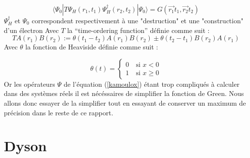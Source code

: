 \documentclass[12pt]{article}
\begin{document}
\begin{equation}
\label{kamoulox}
 \langle \Psi_0 | T \Psi_H (r_1, t_1) \Psi_H^\dagger (r_2, t_2) | \Psi_0 \rangle = G(\vec{r_1} t_1, \vec{r_2}  t_2)
\end{equation}
$\Psi_H^\dagger$ et $\Psi_0$ correspondent respectivement à une "destruction" et une "construction" d'un \'electron
Avec $T$ la ``time-ordering function'' d\'efinie comme suit :
\begin{equation}
 T{A(r_1)B(r_2)} := \theta(t_1 - t_2)A(r_1)B(r_2) \pm \theta(t_2 - t_1)B(r_2) A(r_1)
\end{equation}
Avec $\theta$ la fonction de Heaviside d\'efinie comme suit :

\begin{equation}
\theta(t) = 
\left\{ \begin{array}{rl}
 0 &\ \text{si }x <0\\
 1 &\ \text{si }x \geq 0

\end{array} \right.
\end{equation}
Or les op\'erateurs $\Psi$ de l'\'equation (\ref{kamoulox}) \'etant trop compliqu\'es \`a calculer dans des syst\`emes r\'eels il est n\'ec\'essaires de simplifier la fonction de Green.
Nous allons donc essayer de la simplifier tout en essayant de conserver un maximum de pr\'ecision dans le reste de ce rapport.
\section{Dyson}
\end{document}
